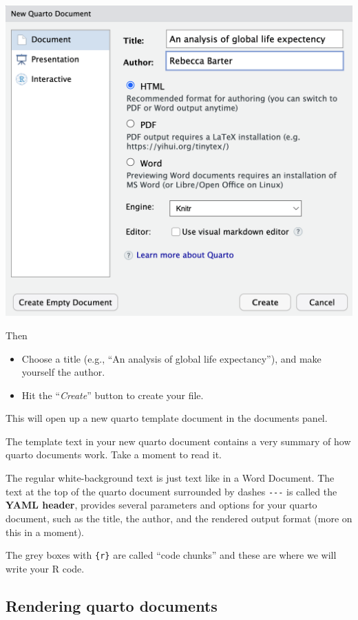 \documentclass[
  letterpaper,
  DIV=11,
  numbers=noendperiod]{scrreprt}
\begin{document}
\includegraphics[width=6.13in,height=\textheight]{figures/new_quarto.png}

Then

\begin{itemize}
\item
  Choose a title (e.g., ``An analysis of global life expectancy''), and
  make yourself the author.
\item
  Hit the ``\emph{Create}'' button to create your file.
\end{itemize}

This will open up a new quarto template document in the documents panel.

The template text in your new quarto document contains a very summary of
how quarto documents work. Take a moment to read it.

The regular white-background text is just text like in a Word Document.
The text at the top of the quarto document surrounded by dashes
\texttt{-\/-\/-} is called the \textbf{YAML header}, provides several
parameters and options for your quarto document, such as the title, the
author, and the rendered output format (more on this in a moment).

The grey boxes with \texttt{\{r\}} are called ``code chunks'' and these
are where we will write your R code.

\subsection{Rendering quarto
documents}\label{rendering-quarto-documents}
\end{document}
